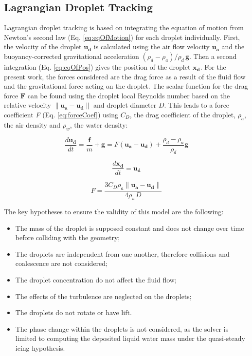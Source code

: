 \subsection{Lagrangian Droplet Tracking}
Lagrangian droplet tracking is based on integrating the equation of motion from Newton’s second law (Eq. \ref{eq:eqOfMotion}) for each droplet individually. First, the velocity of the droplet $\boldsymbol{u_d}$ is calculated using the air flow velocity $\boldsymbol{u_a}$ and the buoyancy-corrected gravitational acceleration $(\rho_d - \rho_a)/\rho_d\,\boldsymbol{g}$. Then a second integration (Eq. \ref{eq:eqOfPos}) gives the position of the droplet $\boldsymbol{x_d}$. For the present work, the forces considered are the drag force as a result of the fluid flow and the gravitational force acting on the droplet. The scalar function for the drag force $\textbf{F}$ can be found using the droplet local Reynolds number based on the relative velocity $\| \boldsymbol{u_a} -  \boldsymbol{u_d}\|$ and droplet diameter $D$. This leads to a force coefficient \textit{F} (Eq. \ref{eq:forceCoef}) using $C_D$, the drag coefficient of the droplet, $\rho_a$, the air density and $\rho_w$, the water density:


\begin{equation}
\frac{d\boldsymbol{u_d}}{dt} = \frac{\textbf{f}}{m} + \textbf{g} = F( \boldsymbol{u_a}- \boldsymbol{u_d}) + \frac{\rho_d-\rho_a}{\rho_d}\textbf{g}
\label{eq:eqOfMotion}
\end{equation}

\begin{equation}
\frac{d\boldsymbol{x_d}}{dt} = \boldsymbol{u_d}
\label{eq:eqOfPos}
\end{equation}

\begin{equation}
F  = \frac{3 C_D  \rho_a \| \boldsymbol{u_a} -  \boldsymbol{u_d}\| }{4 \rho_w D}
\label{eq:forceCoef}
\end{equation}

\noindent The key hypotheses to ensure the validity of this model are the following:

\begin{itemize}
        \item The mass of the droplet is supposed constant and does not change over time before colliding with the geometry;
        \item The droplets are independent from one another, therefore collisions and coalescence are not considered;
        \item The droplet concentration do not affect the fluid flow;
        \item The effects of the turbulence are neglected on the droplets;
        \item The droplets do not rotate or have lift.
        \item The phase change within the droplets is not considered, as the solver is limited to computing the deposited liquid water mass under the quasi-steady icing hypothesis\cite{KIND1998257}.
\end{itemize}

